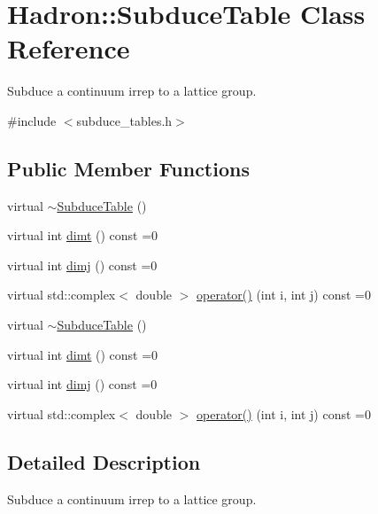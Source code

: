 \hypertarget{classHadron_1_1SubduceTable}{}\section{Hadron\+:\+:Subduce\+Table Class Reference}
\label{classHadron_1_1SubduceTable}


Subduce a continuum irrep to a lattice group.  




{\ttfamily \#include $<$subduce\+\_\+tables.\+h$>$}

\subsection*{Public Member Functions}
\begin{DoxyCompactItemize}
\item 
virtual \mbox{\hyperlink{classHadron_1_1SubduceTable_ab43812f8f47879aedcd5c26941f7cbee}{$\sim$\+Subduce\+Table}} ()
\item 
virtual int \mbox{\hyperlink{classHadron_1_1SubduceTable_ae5940873c5cc8054de1ce2fdc0ffd723}{dimt}} () const =0
\item 
virtual int \mbox{\hyperlink{classHadron_1_1SubduceTable_a04d125e8e09b85787472c3dbb4c93059}{dimj}} () const =0
\item 
virtual std\+::complex$<$ double $>$ \mbox{\hyperlink{classHadron_1_1SubduceTable_a999cf73415a42ed70a12a5c49dc24b0f}{operator()}} (int i, int j) const =0
\item 
virtual \mbox{\hyperlink{classHadron_1_1SubduceTable_ab43812f8f47879aedcd5c26941f7cbee}{$\sim$\+Subduce\+Table}} ()
\item 
virtual int \mbox{\hyperlink{classHadron_1_1SubduceTable_ae5940873c5cc8054de1ce2fdc0ffd723}{dimt}} () const =0
\item 
virtual int \mbox{\hyperlink{classHadron_1_1SubduceTable_a04d125e8e09b85787472c3dbb4c93059}{dimj}} () const =0
\item 
virtual std\+::complex$<$ double $>$ \mbox{\hyperlink{classHadron_1_1SubduceTable_a999cf73415a42ed70a12a5c49dc24b0f}{operator()}} (int i, int j) const =0
\end{DoxyCompactItemize}


\subsection{Detailed Description}
Subduce a continuum irrep to a lattice group. 

